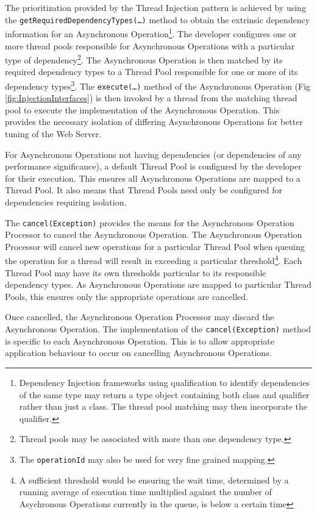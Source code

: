 \documentclass[prodmode]{style/acmlarge}
\begin{document}
The prioritization provided by the Thread Injection pattern is achieved by using
the \texttt{getRequiredDependencyTypes(\ldots)} method to obtain the extrinsic
dependency information for an Asynchronous Operation\footnote{Dependency
Injection frameworks using qualification to identify dependencies of the same
type may return a type object containing both class and qualifier rather than
just a class.  The thread pool matching may then incorporate the qualifier.}.
The developer configures one or more thread pools responsible for Asynchronous
Operations with a particular type of dependency\footnote{Thread pools may be
associated with more than one dependency type.}.  The Asynchronous Operation is
then matched by its required dependency types to a Thread Pool responsible for
one or more of its dependency types\footnote{The \texttt{operationId} may also
be used for very fine grained mapping.}.  The \texttt{execute(\ldots)} method of
the Asynchronous Operation (Fig \ref{fig:InjectionInterfaces}) is then invoked
by a thread from the matching thread pool to execute the implementation of the
Asynchronous Operation.  This provides the necessary isolation of differing
Asynchronous Operations for better tuning of the Web Server.

For Asynchronous Operations not having dependencies (or dependencies of any
performance significance), a default Thread Pool is configured by the developer
for their execution.  This ensures all Asynchronous Operations are mapped to a
Thread Pool.  It also means that Thread Pools need only be configured for
dependencies requiring isolation.

The \texttt{cancel(Exception)} provides the means for the Asynchronous Operation
Processor to cancel the Asynchronous Operation.  The Asynchronous Operation
Processor will cancel new operations for a particular Thread Pool when queuing
the operation for a thread will result in exceeding a particular
threshold\footnote{A sufficient threshold would be ensuring the wait time,
determined by a running average of execution time multiplied against the number
of Asychronous Operations currently in the queue, is below a certain time}.
Each Thread Pool may have its own thresholds particular to its responsible
dependency types.  As Asynchronous Operations are mapped to particular Thread
Pools, this ensures only the appropriate operations are cancelled.

Once cancelled, the Asynchronous Operation Processor may discard the
Asynchronous Operation.  The implementation of the \texttt{cancel(Exception)}
method is specific to each Asynchronous Operation.  This is to allow appropriate
application behaviour to occur on cancelling Asynchronous Operations.
\end{document}
